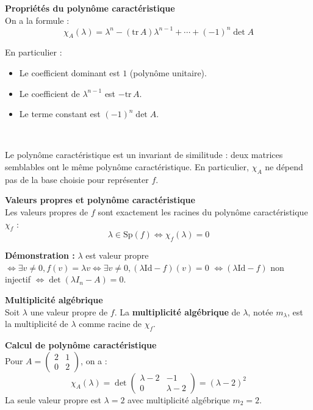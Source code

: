 \documentclass[../PolyS4.tex]{subfiles}
\begin{document}
\begin{Prop}\textbf{Propriétés du polynôme caractéristique}\\

On a la formule :
$$\chi_A(\lambda) = \lambda^n - (\mathrm{tr}\,A)\lambda^{n-1} + \cdots + (-1)^n \det A$$

En particulier :
\begin{itemize}
    \item Le coefficient dominant est $1$ (polynôme unitaire).
    \item Le coefficient de $\lambda^{n-1}$ est $-\mathrm{tr}\,A$.
    \item Le terme constant est $(-1)^n \det A$.
\end{itemize}
\end{Prop}

\begin{Rmq}$\,$

Le polynôme caractéristique est un invariant de similitude : deux matrices semblables ont le même polynôme caractéristique. En particulier, $\chi_A$ ne dépend pas de la base choisie pour représenter $f$.
\end{Rmq}

\begin{Thm}\textbf{Valeurs propres et polynôme caractéristique}\\

Les valeurs propres de $f$ sont exactement les racines du polynôme caractéristique $\chi_f$ :
$$\lambda \in \mathrm{Sp}(f) \Longleftrightarrow \chi_f(\lambda) = 0$$
\end{Thm}

\begin{Rmq}
\textbf{Démonstration :}
$\lambda$ est valeur propre $\iff \exists v \neq 0, f(v) = \lambda v \iff \exists v \neq 0, (\lambda \mathrm{Id} - f)(v) = 0$
$\iff (\lambda \mathrm{Id} - f)$ non injectif $\iff \det(\lambda I_n - A) = 0$.
\end{Rmq}


\begin{Def}\textbf{Multiplicité algébrique}\\

Soit $\lambda$ une valeur propre de $f$. La \textbf{multiplicité algébrique} de $\lambda$, notée $m_\lambda$, est la multiplicité de $\lambda$ comme racine de $\chi_f$.
\end{Def}

\begin{Ex}\textbf{Calcul de polynôme caractéristique}\\

Pour $A = \begin{pmatrix} 2 & 1 \\ 0 & 2 \end{pmatrix}$, on a :
$$\chi_A(\lambda) = \det \begin{pmatrix} \lambda - 2 & -1 \\ 0 & \lambda - 2 \end{pmatrix} = (\lambda - 2)^2$$
La seule valeur propre est $\lambda = 2$ avec multiplicité algébrique $m_2 = 2$.
\end{Ex}
\end{document}
